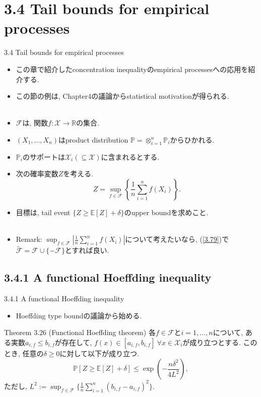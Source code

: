 \documentclass[aspectratio=169, dvipdfmx]{beamer}
\newcommand{\ex}{\mathbb{E}}
\newcommand{\bb}{\mathbb}
\newcommand{\cc}{\mathcal}
\begin{document}
\section{3.4 Tail bounds for empirical processes}
\begin{frame}{3.4 Tail bounds for empirical processes}
\begin{itemize}
    \item この章で紹介したconcentration inequalityのempirical processesへの応用を紹介する.
    \item この節の例は, Chapter4の議論からstatistical motivationが得られる.\\
    　
    \item $\cc{F}$は, 関数$f: \cc{X} \to \bb{R}$の集合.
    \item $(X_1, \dots, X_n)$はproduct distribution $\bb{P} = \otimes_{i=1}^n \bb{P}_i$からひかれる.
    \item $\bb{P}_i$のサポートは$\cc{X}_i (\subseteq \cc{X})$に含まれるとする.
    \item 次の確率変数$Z$を考える.
    \[
        Z = \sup_{f \in \cc{F}} \left\{ \frac{1}{n}\sum_{i=1}^n f(X_i)  \right\}.
        \tag{3.79}\label{3.79}
    \]
    \item 目標は, tail event $\{Z \ge \ex[Z] + \delta\}$のupper boundを求めこと.\\
    　
    \item Remark: $\sup_{f\in\cc{F}}|\frac{1}{n}\sum_{i=1}^n f(X_i)|$について考えたいなら,
    (\ref{3.79})で$\tilde{\cc{F}} = \cc{F} \cup \{-\cc{F}\}$とすれば良い.
\end{itemize}
\end{frame}

\subsection{3.4.1 A functional Hoeffding inequality}
\begin{frame}{3.4.1 A functional Hoeffding inequality}
    \begin{itemize}
        \item Hoeffding type boundの議論から始める.
    \end{itemize}
    \begin{block}{Theorem 3.26 (Functional Hoeffding theorem)}
        各$f\in\cc{F}$と$i = 1,\dots,n$について,
        ある実数$a_{i,f}\le b_{i,f}$が存在して,
        $f(x) \in [a_{i,f}, b_{i,f}]\ \forall x \in \cc{X}_i$が成り立つとする.
        このとき, 任意の$\delta \ge 0$に対して以下が成り立つ.
        \[
            \bb{P}[Z \ge \ex[Z] +\delta]
            \le \exp\left(-\frac{n\delta^2}{4L^2}\right),
            \tag{3.80}\label{3.80}
        \]
        ただし, $L^2 := \sup_{f \in \cc{F}} \{\frac{1}{n}\sum_{i=1}^n (b_{i,f} - a_{i,f})^2\}$.
    \end{block}
\end{frame}
\end{document}
